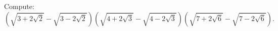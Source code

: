 Compute: \[\left(\sqrt{3+2\sqrt{2}}-\sqrt{3-2\sqrt{2}}\right)\left(\sqrt{4+2\sqrt{3}}-\sqrt{4-2\sqrt{3}}\right)\left(\sqrt{7+2\sqrt{6}}-\sqrt{7-2\sqrt{6}}\right).\]
